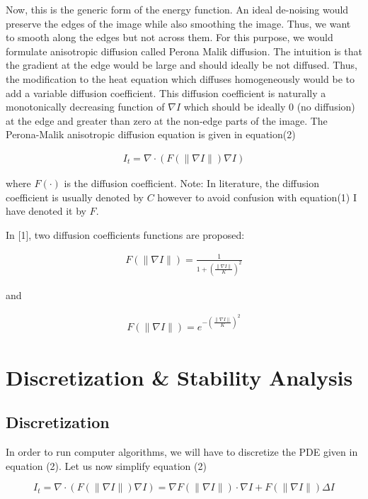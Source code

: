 \documentclass{article}
\begin{document}
Now, this is the generic form of the energy function. An ideal de-noising would preserve the edges of the image while also smoothing the image. Thus, we want to smooth along the edges but not across them. For this purpose, we would formulate anisotropic diffusion called Perona Malik diffusion. The intuition is that the gradient at the edge would be large and should ideally be not diffused. Thus, the modification to the heat equation which diffuses homogeneously would be to add a variable diffusion coefficient. This diffusion coefficient is naturally a monotonically decreasing function of \( \nabla I \) which should be ideally 0 (no diffusion) at the edge and greater than zero at the non-edge parts of the image. The Perona-Malik anisotropic diffusion equation is given in equation(2)

\begin{align}
I_t = \nabla \cdot(F(\|\nabla I\|)\nabla I)
\end{align}

where \( F(\cdot) \) is the diffusion coefficient. Note: In literature, the diffusion coefficient is usually denoted by \( C \) however to avoid confusion with equation(1) I have denoted it by \( F \).

In [1], two diffusion coefficients functions are proposed:

\begin{align}
F(\|\nabla I\|) = \frac{1}{1 + \left(\frac{\|\nabla I\|}{K}\right)^2}
\end{align}

and

\begin{align}
F(\|\nabla I\|) = e^{-\left(\frac{\|\nabla I\|}{K}\right)^2}
\end{align}

\section{Discretization \& Stability Analysis}

\subsection{Discretization}

In order to run computer algorithms, we will have to discretize the PDE given in equation (2). Let us now simplify equation (2)

\[
I_t = \nabla \cdot (F(\|\nabla I\|)\nabla I)
    = \nabla F(\|\nabla I\|) \cdot \nabla I + F(\|\nabla I\|)\Delta I \tag{5}
\]
\end{document}
